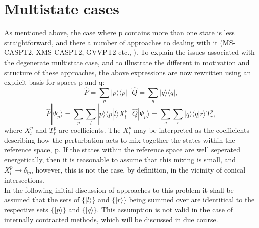 \documentclass[12pt]{article}
\begin{document}
\section{ Multistate cases }
\noindent As mentioned above, the case where $\mathrm{p}$ contains more than one state is less straightforward, and there
a number of approaches to dealing with it (MS-CASPT2, XMS-CASPT2, GVVPT2 etc., ).  To explain the issues associated with the
degenerate multistate case, and to illustrate the different in motivation and structure of these approaches,
the above expressions are now rewritten using an explicit basis for spaces $\mathrm{p}$ and $\mathrm{q}$:
\begin{equation*}
\hat{P} =\sum_{p} | p \rangle \langle p |  \text{\ \ \ \ \ }
\hat{Q} =\sum_{q} | q \rangle \langle q | ,
\end{equation*}
\begin{equation*}
\hat{P}|\Psi_{p}\rangle =\sum_{p}\sum_{l} | p \rangle \langle p | l \rangle X_{l}^{p}
\text{ \ \ \ \ \ \ }
\hat{Q}|\Psi_{p}\rangle =\sum_{q}\sum_{r} | q \rangle \langle q | r \rangle T_{r}^{p},
\end{equation*}
where $X_{l}^{p}$ and $T_{r}^{p}$ are coefficients. The $X_{l}^{p}$ may be interpreted
as the coefficients describing how the perturbation acts to mix together the
states within the reference space, $\mathrm{p}$. If the states within the reference 
space are well seperated energetically, then it is reasonable to assume that this
mixing is small, and $X_{l}^{p} \rightarrow \delta_{lp} $, however, this is not the case,
by definition, in the vicinity of conical intersections.\\

\noindent In the following initial discussion of approaches to this problem it shall be assumed that 
the sets of $\{|l\rangle\}$ and $\{|r\rangle\}$ being summed over are identitical to the respective sets
$\{|p\rangle\}$ and $\{|q\rangle\}$. This assumption is not valid in the case of internally contracted 
methods, which will be discussed in due course.\\
\end{document}
